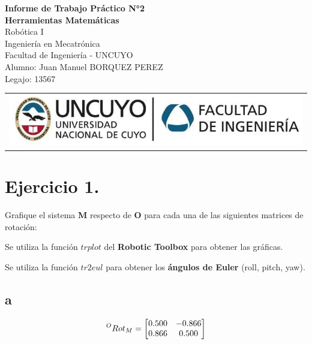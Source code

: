 \documentclass[a4paper,12pt]{article}
\begin{document}
\begin{titlepage}
    \centering
    \vspace*{5cm}
    {\Huge\bfseries Informe de Trabajo Práctico N°2}\\
    \vspace{0.2cm}
    {\Large \textbf{Herramientas Matemáticas}}\\
    \vspace{0.5cm}
    {\Large Robótica I}\\
    \vspace{0.5 cm}
    {\Large Ingeniería en Mecatrónica}\\
    \vspace{0.2 cm}
    {\Large Facultad de Ingeniería - UNCUYO}\\
    \vspace{1.5cm}
    Alumno: Juan Manuel BORQUEZ PEREZ\\
    Legajo: 13567\\
    \vfill
    {\begin{tabular}{@{}c@{}}\includegraphics[scale=0.4]{escudo.PNG}\end{tabular}}\hspace{10pt}
\end{titlepage}

\section{Ejercicio 1.}
Grafique el sistema \textbf{M} respecto de \textbf{O} para cada una de las siguientes matrices
de rotación:

Se utiliza la función $trplot$ del \textbf{Robotic Toolbox} para obtener las gráficas.

Se utiliza la función $tr2eul$ para obtener los \textbf{ángulos de Euler} (roll, pitch, yaw).

\subsection{a}
\begin{equation*}
    \prescript{O}{}{Rot_M} = 
    \begin{bmatrix}
        0.500 & -0.866\\
        0.866 & 0.500
    \end{bmatrix}
\end{equation*}
\end{document}
